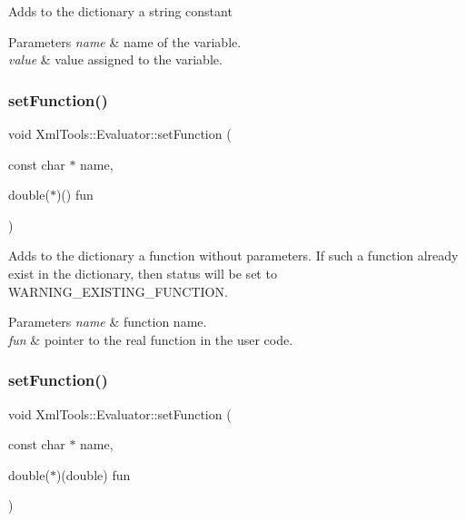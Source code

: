 Adds to the dictionary a string constant


\begin{DoxyParams}{Parameters}
{\em name} & name of the variable. \\
\hline
{\em value} & value assigned to the variable. \\
\hline
\end{DoxyParams}
\hypertarget{class_xml_tools_1_1_evaluator_a54a432d7beccf23e2bebda5e449fffe0}{}\label{class_xml_tools_1_1_evaluator_a54a432d7beccf23e2bebda5e449fffe0} 
\subsubsection{\texorpdfstring{set\+Function()}{setFunction()}\hspace{0.1cm}{\footnotesize\ttfamily [1/6]}}
{\footnotesize\ttfamily void Xml\+Tools\+::\+Evaluator\+::set\+Function (\begin{DoxyParamCaption}\item[{const char $\ast$}]{name,  }\item[{double($\ast$)()}]{fun }\end{DoxyParamCaption})}

Adds to the dictionary a function without parameters. If such a function already exist in the dictionary, then status will be set to W\+A\+R\+N\+I\+N\+G\+\_\+\+E\+X\+I\+S\+T\+I\+N\+G\+\_\+\+F\+U\+N\+C\+T\+I\+ON.


\begin{DoxyParams}{Parameters}
{\em name} & function name. \\
\hline
{\em fun} & pointer to the real function in the user code. \\
\hline
\end{DoxyParams}
\hypertarget{class_xml_tools_1_1_evaluator_a2183927ba22512c28f9933439d88d6c7}{}\label{class_xml_tools_1_1_evaluator_a2183927ba22512c28f9933439d88d6c7} 
\subsubsection{\texorpdfstring{set\+Function()}{setFunction()}\hspace{0.1cm}{\footnotesize\ttfamily [2/6]}}
{\footnotesize\ttfamily void Xml\+Tools\+::\+Evaluator\+::set\+Function (\begin{DoxyParamCaption}\item[{const char $\ast$}]{name,  }\item[{double($\ast$)(double)}]{fun }\end{DoxyParamCaption})}

